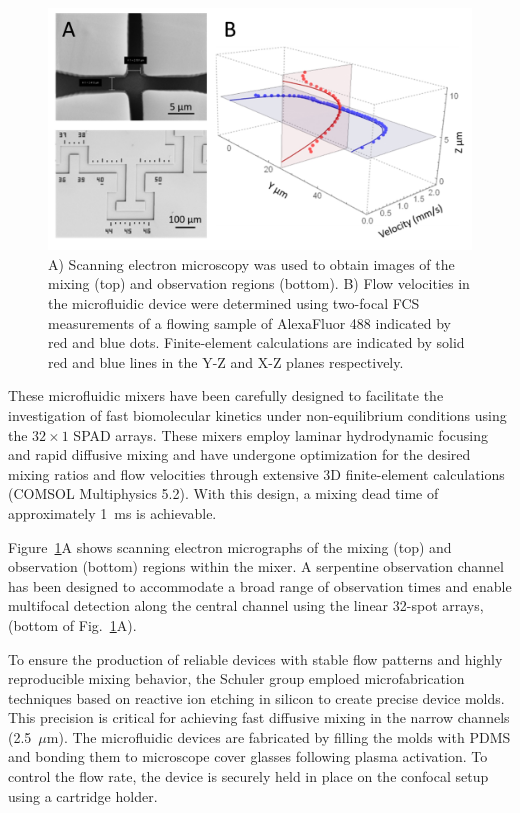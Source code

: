 \begin{figure}
    \centering
    \includegraphics[width=\textwidth]{chapters/figures/schuler_mixer.jpg}
    \caption{\label{fig:schuler_mixer} 
    A) Scanning electron microscopy was used to obtain images of the mixing (top) and observation regions (bottom). 
    B) Flow velocities in the microfluidic device were determined using two-focal \ac{FCS} measurements of a flowing sample of AlexaFluor 488 indicated by red and blue dots.
    Finite-element calculations are indicated by solid red and blue lines in the Y-Z and X-Z planes respectively.
    }
\end{figure}

These microfluidic mixers have been carefully designed to facilitate the investigation of fast biomolecular kinetics under non-equilibrium conditions using the $32\times1$ \ac{SPAD} arrays. 
These mixers employ laminar hydrodynamic focusing and rapid diffusive mixing and have undergone optimization for the desired mixing ratios and flow velocities through extensive 3D finite-element calculations (COMSOL Multiphysics 5.2). 
With this design, a mixing dead time of approximately 1~ms is achievable. 

Figure~\ref{fig:schuler_mixer}A shows scanning electron micrographs of the mixing (top) and observation (bottom) regions within the mixer. 
A serpentine observation channel has been designed to accommodate a broad range of observation times and enable multifocal detection along the central channel using the linear 32-spot arrays, (bottom of Fig.~\ref{fig:schuler_mixer}A).

To ensure the production of reliable devices with stable flow patterns and highly reproducible mixing behavior, the Schuler group emploed microfabrication techniques based on reactive ion etching in silicon to create precise device molds. 
This precision is critical for achieving fast diffusive mixing in the narrow channels (2.5~$\mu$m). 
The microfluidic devices are fabricated by filling the molds with \ac{PDMS} and bonding them to microscope cover glasses following plasma activation. 
To control the flow rate, the device is securely held in place on the confocal setup using a cartridge holder. 

